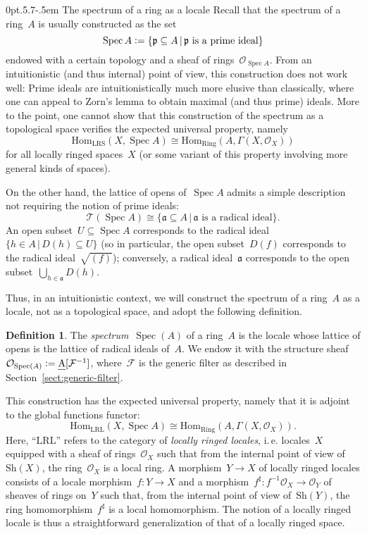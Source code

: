 \documentclass[10pt,reqno,a4paper]{amsbook}
\makeatletter
\theoremstyle{definition}
\newtheorem{defn}{Definition}[section]
\theoremstyle{plain}
\theoremstyle{remark}
\newcommand{\F}{\mathcal{F}}
\renewcommand{\O}{\mathcal{O}}
\newcommand{\T}{\mathcal{T}}
\newcommand{\aaa}{\mathfrak{a}}
\newcommand{\ppp}{\mathfrak{p}}
\newcommand{\Hom}{\mathrm{Hom}}
\let\oldul\ul
\renewcommand{\ul}[1]{\text{\oldul{$#1$}}}
\newcommand{\Sh}{\mathrm{Sh}}
\newcommand{\Ring}{\mathrm{Ring}}
\newcommand{\LRL}{\mathrm{LRL}}
\newcommand{\LRS}{\mathrm{LRS}}
\DeclareMathOperator{\Spec}{Spec}
\newcommand{\Open}{\T}
\newcommand{\?}{\,{:}\,}
\renewcommand{\_}{\mathpunct{.}\,}
\newcommand{\ie}{i.\,e.\@\xspace}
\newcommand{\defeq}{\vcentcolon=}
\def\subsection{\@startsection{subsection}{2}%
  {0pt}{.5\linespacing\@plus.7\linespacing}{-.5em}%
  {\normalfont\bfseries}}
\makeatother
\begin{document}
\subsection{The spectrum of a ring as a locale}
\label{sect:spectrum-as-a-locale}
Recall that the spectrum
of a ring~$A$ is usually constructed as the set
\[ \Spec A \defeq \{ \ppp \subseteq A \,|\,
  \text{$\ppp$ is a prime ideal} \} \]
endowed with a certain topology and a sheaf of rings~$\O_{\Spec A}$. From an
intuitionistic (and thus internal) point of view, this construction does not
work well: Prime ideals are intuitionistically much more elusive than
classically, where one can appeal to Zorn's lemma to obtain maximal (and thus
prime) ideals. More to the point, one cannot show that this construction of
the spectrum as a topological space verifies the expected universal property,
namely
\[ \Hom_\LRS(X, \Spec A) \cong \Hom_\Ring(A, \Gamma(X, \O_X)) \]
for all locally ringed spaces~$X$ (or some variant of this property involving
more general kinds of spaces).

On the other hand, the lattice of opens of~$\Spec A$ admits a simple
description not requiring the notion of prime ideals:
\[ \Open(\Spec A) \cong \{ \aaa \subseteq A \,|\,
  \text{$\aaa$ is a radical ideal} \}. \]
An open subset~$U \subseteq \Spec A$ corresponds to the radical ideal~$\{ h \in
A \,|\, D(h) \subseteq U \}$ (so in particular, the open subset~$D(f)$
corresponds to the radical ideal~$\sqrt{(f)}$); conversely, a radical ideal~$\aaa$
corresponds to the open subset~$\bigcup_{h \in \aaa} D(h)$.

Thus, in an intuitionistic context, we will construct the spectrum of a ring~$A$
as a locale, not as a topological space, and adopt the following definition.

\begin{defn}\label{defn:spectrum-as-a-locale}
The \emph{spectrum}~$\Spec(A)$ of a ring~$A$ is the locale whose lattice of
opens is the lattice of radical ideals of~$A$. We endow it with the structure
sheaf~$\O_{\Spec(A)} \defeq \ul{A}[\F^{-1}]$, where~$\F$ is the generic filter
as described in Section~\ref{sect:generic-filter}.\end{defn}

This construction has the expected
universal property, namely that it is adjoint to the global functions functor:
\[ \Hom_{\LRL}(X, \Spec A) \cong \Hom_{\Ring}(A, \Gamma(X,\O_X)). \]
Here, ``$\LRL$'' refers to the category of \emph{locally ringed locales}, \ie
locales~$X$ equipped with a sheaf of rings~$\O_X$ such that from the internal point of
view of~$\Sh(X)$, the ring~$\O_X$ is a local ring. A morphism~$Y \to X$ of
locally ringed locales consists of a locale morphism~$f : Y \to X$ and a
morphism~$f^\sharp : f^{-1} \O_X \to \O_Y$ of sheaves of rings on~$Y$ such that, from the
internal point of view of~$\Sh(Y)$, the ring homomorphism~$f^\sharp$ is a local
homomorphism. The notion of a locally ringed locale is thus a straightforward
generalization of that of a locally ringed space.
\end{document}
